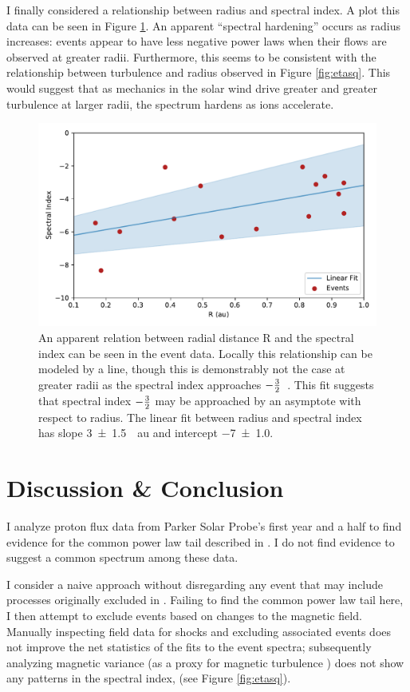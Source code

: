 \documentclass[letterpaper,11pt]{article}
\begin{document}
I finally considered a relationship between radius and spectral index.  A plot this data can be seen in Figure \ref{fig:specidx_vs_R}.  An apparent ``spectral hardening'' occurs as radius increases: events appear to have less negative power laws when their flows are observed at greater radii.  Furthermore, this seems to be consistent with the relationship between turbulence and radius observed in Figure \ref{fig:etasq}.  This would suggest that as mechanics in the solar wind drive greater and greater turbulence at larger radii, the spectrum hardens as ions accelerate.

\begin{figure}[htbp]
\centering
\includegraphics[width=0.9\linewidth]{figures/specidx_vs_R.pdf}
\caption{An apparent relation between radial distance R and the spectral index can be seen in the event data.  Locally this relationship can be modeled by a line, though this is demonstrably not the case at greater radii as the spectral index approaches $-{3 \over 2}$~\citep{Fisk2008,Fisk2006}.  This fit suggests that spectral index $-{3 \over 2}$ may be approached by an asymptote with respect to radius.  The linear fit between radius and spectral index has slope \SI{3 \pm 1.5}{\per \astronomicalunit} and intercept \SI{-7 \pm 1.0}{}.}
\label{fig:specidx_vs_R}
\end{figure}

\section{Discussion \& Conclusion}
\label{sec:conclusion}
I analyze proton flux data from Parker Solar Probe's first year and a half to find evidence for the common power law tail described in \citet{Fisk2006}.  I do not find evidence to suggest a common spectrum among these data.

I consider a naive approach without disregarding any event that may include processes originally excluded in \citet{Fisk2006}.  Failing to find the common power law tail here, I then attempt to exclude events based on changes to the magnetic field.  Manually inspecting field data for shocks and excluding associated events does not improve the net statistics of the fits to the event spectra; subsequently analyzing magnetic variance (as a proxy for magnetic turbulence \citep{Schwadron1996}) does not show any patterns in the spectral index, (see Figure \ref{fig:etasq}).
\end{document}
